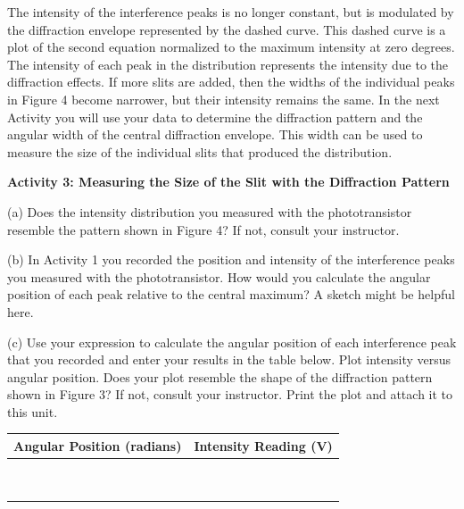 The intensity of the interference peaks is no longer constant, but
is modulated by the diffraction envelope represented by the dashed
curve. This dashed curve is a plot of the second equation normalized
to the maximum intensity at zero degrees. The intensity of each peak
in the distribution represents the intensity due to the diffraction
effects. If more slits are added, then the widths of the individual
peaks in Figure 4 become narrower, but their intensity remains the
same. In the next Activity you will use your data to determine the
diffraction pattern and the angular width of the central diffraction
envelope. This width can be used to measure the size of the individual
slits that produced the distribution.

\textbf{Activity 3: Measuring the Size of the Slit with the Diffraction
Pattern }

(a) Does the intensity distribution you measured with the phototransistor
resemble the pattern shown in Figure 4? If not, consult your instructor.
\vspace{10mm}

(b) In Activity 1 you recorded the position and intensity of the interference
peaks you measured with the phototransistor. How would you calculate
the angular position of each peak relative to the central maximum?
A sketch might be helpful here.
\vspace{30mm}

(c) Use your expression to calculate the angular position of each
interference peak that you recorded and enter your results in the
table below. Plot intensity versus angular position.
Does your plot resemble the shape of the diffraction pattern shown
in Figure 3? If not, consult your instructor. Print the plot and attach
it to this unit.

\vspace{0.3cm}
{\centering \begin{tabular}{|c|c|}
\hline 
Angular Position (radians)&
Intensity Reading (V)\\
\hline
\hline 
&
\\
\hline 
&
\\
\hline 
&
\\
\hline 
&
\\
\hline 
&
\\
\hline 
&
\\
\hline 
&
\\
\hline 
&
\\
\hline 
&
\\
\hline
\end{tabular}\par}
\vspace{0.3cm}

